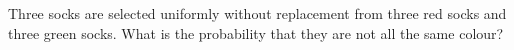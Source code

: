 Three socks are selected uniformly without replacement from three red socks and three green socks. What is the probability that they are not all the same colour?
